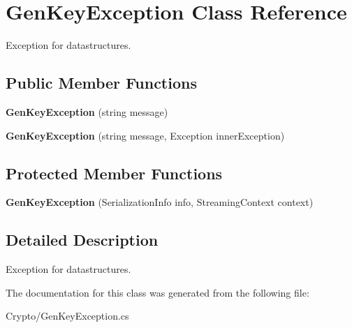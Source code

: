 \hypertarget{class_gen_key_exception}{
\section{GenKeyException Class Reference}
\label{class_gen_key_exception}
}


Exception for datastructures.  


\subsection*{Public Member Functions}
\begin{DoxyCompactItemize}
\item 
\hypertarget{class_gen_key_exception_ae8de93a8f016d67c2c8cfde1fe3d15c4}{
{\bfseries GenKeyException} (string message)}
\label{class_gen_key_exception_ae8de93a8f016d67c2c8cfde1fe3d15c4}

\item 
\hypertarget{class_gen_key_exception_a89df8b04638fae6a155849d109d2189b}{
{\bfseries GenKeyException} (string message, Exception innerException)}
\label{class_gen_key_exception_a89df8b04638fae6a155849d109d2189b}

\end{DoxyCompactItemize}
\subsection*{Protected Member Functions}
\begin{DoxyCompactItemize}
\item 
\hypertarget{class_gen_key_exception_a728c2a0086dd84b7b23487b2af04e0fa}{
{\bfseries GenKeyException} (SerializationInfo info, StreamingContext context)}
\label{class_gen_key_exception_a728c2a0086dd84b7b23487b2af04e0fa}

\end{DoxyCompactItemize}


\subsection{Detailed Description}
Exception for datastructures. 

The documentation for this class was generated from the following file:\begin{DoxyCompactItemize}
\item 
Crypto/GenKeyException.cs\end{DoxyCompactItemize}
